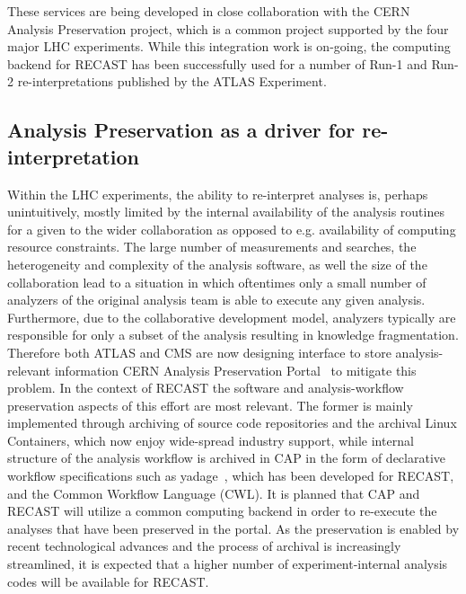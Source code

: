 These services are being developed in close collaboration with the CERN Analysis Preservation project, which is a common project supported by the four major LHC experiments. While this integration work is on-going, the computing backend for RECAST has been successfully used for a number of Run-1 and Run-2 re-interpretations published by the ATLAS Experiment.


\subsection{Analysis Preservation as a driver for re-interpretation}

Within the LHC experiments, the ability to re-interpret analyses is, perhaps unintuitively, mostly limited by the internal availability of the analysis routines for a given to the wider collaboration as opposed to e.g. availability of computing resource constraints. The large number of measurements and searches, the heterogeneity and complexity of the analysis software, as well the size of the collaboration lead to a situation in which oftentimes only a small number of analyzers of the original analysis team is able to execute any given analysis. Furthermore, due to the collaborative development model, analyzers typically are responsible for only a subset of the analysis resulting in knowledge fragmentation. Therefore both ATLAS and CMS are now designing interface to store analysis-relevant information CERN Analysis Preservation Portal~\cite{CAP} to mitigate this problem. In the context of RECAST the software and analysis-workflow preservation aspects of this effort are most relevant. The former is mainly implemented through archiving of source code repositories and the archival Linux Containers, which now enjoy wide-spread industry support, while internal structure of the analysis workflow is archived in CAP in the form of declarative workflow specifications such as yadage~\cite{Cranmer:2017frf}, which has been developed for RECAST, and the Common Workflow Language (CWL)\cite{CWL}. It is planned that CAP and RECAST will utilize a common computing backend in order to re-execute the analyses that have been preserved in the portal. As the preservation is enabled by recent technological advances and the process of archival is increasingly streamlined, it is expected that a higher number of  experiment-internal analysis codes will be available for RECAST.

